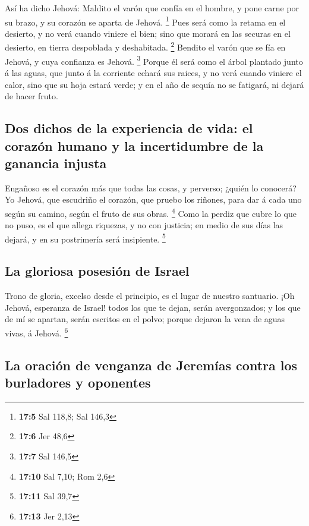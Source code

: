  Así ha dicho Jehová: Maldito el varón que confía en el
hombre, y pone carne por su brazo, y su corazón se aparta de Jehová.
\footnote{\textbf{17:5} Sal 118,8; Sal 146,3}  Pues será
como la retama en el desierto, y no verá cuando viniere el bien; sino
que morará en las securas en el desierto, en tierra despoblada y
deshabitada. \footnote{\textbf{17:6} Jer 48,6}  Bendito el
varón que se fía en Jehová, y cuya confianza es Jehová. \footnote{\textbf{17:7}
  Sal 146,5}  Porque él será como el árbol plantado junto
á las aguas, que junto á la corriente echará sus raices, y no verá
cuando viniere el calor, sino que su hoja estará verde; y en el año de
sequía no se fatigará, ni dejará de hacer fruto.

\hypertarget{dos-dichos-de-la-experiencia-de-vida-el-corazuxf3n-humano-y-la-incertidumbre-de-la-ganancia-injusta}{%
\subsection{Dos dichos de la experiencia de vida: el corazón humano y la
incertidumbre de la ganancia
injusta}\label{dos-dichos-de-la-experiencia-de-vida-el-corazuxf3n-humano-y-la-incertidumbre-de-la-ganancia-injusta}}

 Engañoso es el corazón más que todas las cosas, y
perverso; ¿quién lo conocerá?  Yo Jehová, que escudriño
el corazón, que pruebo los riñones, para dar á cada uno según su camino,
según el fruto de sus obras. \footnote{\textbf{17:10} Sal 7,10; Rom 2,6}
 Como la perdiz que cubre lo que no puso, es el que
allega riquezas, y no con justicia; en medio de sus días las dejará, y
en su postrimería será insipiente. \footnote{\textbf{17:11} Sal 39,7}

\hypertarget{la-gloriosa-posesiuxf3n-de-israel}{%
\subsection{La gloriosa posesión de
Israel}\label{la-gloriosa-posesiuxf3n-de-israel}}

 Trono de gloria, excelso desde el principio, es el lugar
de nuestro santuario.  ¡Oh Jehová, esperanza de Israel!
todos los que te dejan, serán avergonzados; y los que de mí se apartan,
serán escritos en el polvo; porque dejaron la vena de aguas vivas, á
Jehová. \footnote{\textbf{17:13} Jer 2,13}

\hypertarget{la-oraciuxf3n-de-venganza-de-jeremuxedas-contra-los-burladores-y-oponentes}{%
\subsection{La oración de venganza de Jeremías contra los burladores y
oponentes}\label{la-oraciuxf3n-de-venganza-de-jeremuxedas-contra-los-burladores-y-oponentes}}

